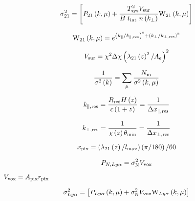 \begin{equation}
\sigma_{21}^2 = \left[ P_{21}\left(k, \mu \right) + \frac{T^2_{\rm sys} V_{\rm sur}}{B \ t_{\rm int} \ n \left(k_{\perp}\right)} {\rm W}_{21}\left(k, \mu \right) \right]
\end{equation}

\begin{equation}
{\rm W}_{21}\left(k, \mu \right) = e^{\left(k_{\parallel} / k_{\parallel, \rm res} \right)^2 + \left(k_{\perp} / k_{\perp, \rm res} \right)^2}
\end{equation}

\begin{equation}
V_{\rm sur} = \chi^2 \Delta \chi \left( \lambda_{21} \left( z \right)^2 / A_e\right)^2
\end{equation}

\begin{equation}
\frac{1}{\sigma^2 \left( k \right)} = \sum_{\mu} \frac{N_{\rm m}}{\sigma^2 \left( k, \mu \right)}
\end{equation}

\begin{equation}
k_{\parallel, \rm res} = \frac{R_{\rm res} H \left( z\right)}{c \left(1 + z\right)} = \frac{1}{\Delta x_{\parallel, \rm res}}
\end{equation}

\begin{equation}
k_{\perp, \rm res} = \frac{1}{\chi \left( z \right) \theta_{\rm min}} = \frac{1}{\Delta x_{\perp, \rm res}}
\end{equation}

\begin{equation}
x_{\rm pix} = \left( \lambda_{21} \left( z \right) / l_{\rm max}\right) \left( \pi / 180 \right) / 60
\end{equation}


\begin{equation}
P_{N, Ly\alpha} = \sigma_{\rm N}^2 V_{\rm vox}
\end{equation}

$V_{\rm vox} = A_{\rm pix} r_{\rm pix}$

\begin{equation}
\sigma_{Ly\alpha}^2 = \left[ P_{Ly\alpha}\left(k, \mu \right) + \sigma_{\rm N}^2 V_{\rm vox} {\rm W}_{Ly\alpha}\left(k, \mu \right) \right]
\end{equation}
